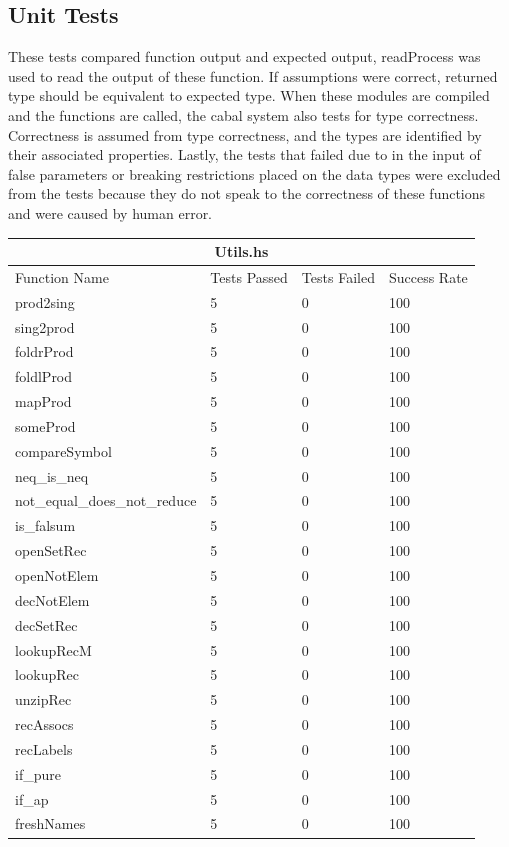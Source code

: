 \documentclass[12pt, svgnames]{article}
\begin{document}
\subsection{Unit Tests}
These tests compared function output and expected output, readProcess was used 
to read the output of these function. If assumptions were correct, returned 
type should be equivalent to expected type. When these modules are compiled and 
the functions are called, the cabal system also tests for type correctness. 
Correctness is assumed from type correctness, and the types are identified by 
their associated properties. Lastly, the tests that failed due to in the input 
of false parameters or breaking restrictions placed on the data types were 
excluded from the tests because they do not speak to the correctness of these 
functions and were caused by human error.\\
\begin{adjustwidth}{-0.5cm}{}

\begin{tabular}[h!]{ |p{5cm}||p{3cm}|p{3cm}|p{3cm}|  }
    
    \hline
    \multicolumn{4}{|c|}{Utils.hs} \\
    \hline
    Function Name & Tests Passed & Tests Failed & Success Rate\\
    \hline
    prod2sing   & 5    &0&   100\\
    sing2prod&   5  & 0   &100\\
    foldrProd &5 & 0&  100\\
    foldlProd &5 & 0&  100\\
    mapProd&   5  & 0&100\\
    someProd& 5  & 0   &100\\
    compareSymbol& 5  & 0&100\\
    neq\_is\_neq& 5  & 0&100\\
    not\_equal\_does\_not\_reduce& 5  & 0&100\\
    is\_falsum& 5  & 0&100\\
    openSetRec& 5  & 0&100\\
    openNotElem& 5  & 0&100\\
    decNotElem& 5  & 0&100\\
    decSetRec& 5  & 0&100\\
    lookupRecM& 5  & 0&100\\
    lookupRec& 5  & 0&100\\
    unzipRec& 5  & 0&100\\
    recAssocs& 5  & 0&100\\
    recLabels& 5  & 0&100\\
    if\_pure& 5  & 0&100\\
    if\_ap& 5  & 0&100\\
    freshNames& 5  & 0 &100\\
    \hline
\end{tabular}

\end{adjustwidth}
\end{document}
